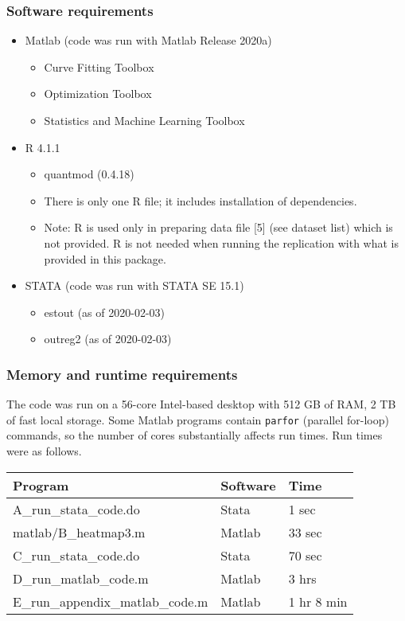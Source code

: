 \documentclass[12pt,english]{article}
\providecommand{\tabularnewline}{\\}
\begin{document}
	\subsubsection*{Software requirements}
	\begin{itemize}
		\item Matlab (code was run with Matlab Release 2020a)
		\begin{itemize}
			\item Curve Fitting Toolbox
			\item Optimization Toolbox
			\item Statistics and Machine Learning Toolbox
		\end{itemize}
		\item R 4.1.1
		\begin{itemize}
			\item quantmod (0.4.18)
			\item There is only one R file; it includes installation of dependencies.
			\item Note: R is used only in preparing data file {[}5{]} (see dataset list)
			which is not provided. R is not needed when running the replication
			with what is provided in this package. 
		\end{itemize}
		\item STATA (code was run with STATA SE 15.1)
		\begin{itemize}
			\item estout (as of 2020-02-03)
			\item outreg2 (as of 2020-02-03)
		\end{itemize}
	\end{itemize}
	
	\subsubsection*{Memory and runtime requirements}
	
	The code was run on a 56-core Intel-based desktop with 512 GB of RAM,
	2 TB of fast local storage. Some Matlab programs contain \texttt{parfor}
	(parallel for-loop) commands, so the number of cores substantially
	affects run times. Run times were as follows.
	
	\vspace{0.5cm}
	
	\noindent%
	\begin{tabular}{lll}
		\hline 
		Program & Software & Time\tabularnewline
		\hline 
		A\_run\_stata\_code.do & Stata & 1 sec\tabularnewline
		matlab/B\_heatmap3.m & Matlab & 33 sec\tabularnewline
		C\_run\_stata\_code.do & Stata & 70 sec\tabularnewline
		D\_run\_matlab\_code.m & Matlab & 3 hrs\tabularnewline
		E\_run\_appendix\_matlab\_code.m & Matlab & 1 hr 8 min \tabularnewline
		\hline 
	\end{tabular}
	
\end{document}
